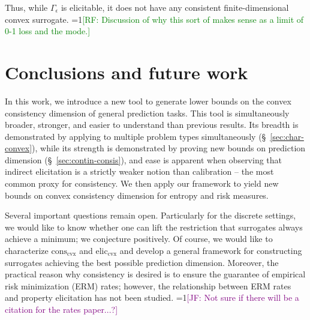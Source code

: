 \documentclass[11pt]{article} %
\newcommand{\Comments}{1}
\newcommand{\mynote}[2]{\ifnum\Comments=1\textcolor{#1}{#2}\fi}
\newcommand{\raf}[1]{\mynote{green}{[RF: #1]}}
\newcommand{\jessie}[1]{\mynote{purple}{[JF: #1]}}
\newcommand{\reals}{\mathbb{R}}
\newcommand{\eliccvx}{\mathrm{elic}_\mathrm{cvx}}
\newcommand{\conscvx}{\mathrm{cons}_\mathrm{cvx}}
\newcommand{\Y}{\mathcal{Y}}
\begin{document}
Thus, while $\Gamma_\epsilon$ is elicitable, it does not have any consistent finite-dimensional convex surrogate.
\raf{Discussion of why this sort of makes sense as a limit of 0-1 loss and the mode.}


\section{Conclusions and future work}\label{sec:conclusions}
In this work, we introduce a new tool to generate lower bounds on the convex consistency dimension of general prediction tasks.
This tool is simultaneously broader, stronger, and easier to understand than previous results.
Its breadth is demonstrated by applying to multiple problem types simultaneously (\S~\ref{sec:char-convex}), while its strength is demonstrated by proving new bounds on prediction dimension (\S~\ref{sec:contin-consis}), and ease is apparent when observing that indirect elicitation is a strictly weaker notion than calibration -- the most common proxy for consistency.
We then apply our framework to yield new bounds on convex consistency dimension for entropy and risk measures.

Several important questions remain open.
Particularly for the discrete settings, we would like to know whether one can lift the restriction that surrogates always achieve a minimum; we conjecture positively.
Of course, we would like to characterize $\conscvx$ and $\eliccvx$ and develop a general framework for constructing surrogates achieving the best possible prediction dimension.
Moreover, the practical reason why consistency is desired is to ensure the guarantee of empirical risk minimization (ERM) rates; however, the relationship between ERM rates and property elicitation has not been studied.
\jessie{Not sure if there will be a citation for the rates paper...?}
\end{document}
